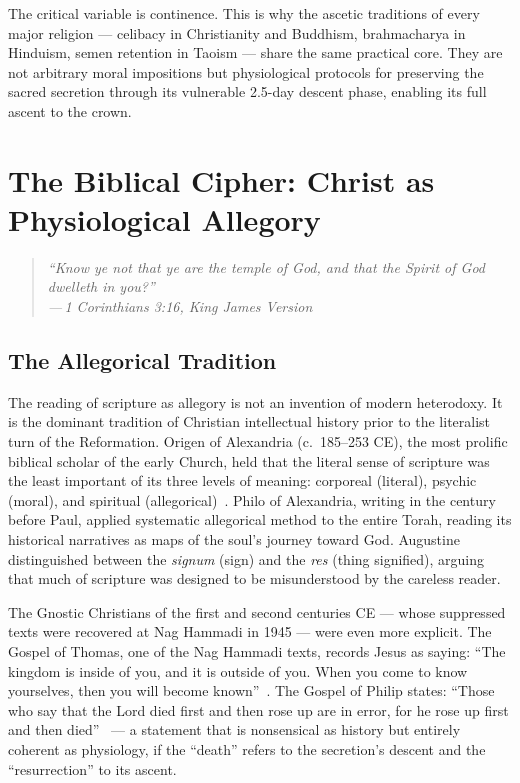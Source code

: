 \documentclass[12pt, a4paper]{article}
\newcommand{\epigraph}[2]{%
  \begin{quote}
    \itshape ``#1''\\[0.3em]
    \normalfont\small\hfill ---\,#2
  \end{quote}
}
\begin{document}
The critical variable is continence. This is why the ascetic traditions of
every major religion — celibacy in Christianity and Buddhism, brahmacharya in
Hinduism, semen retention in Taoism — share the same practical core. They are
not arbitrary moral impositions but physiological protocols for preserving the
sacred secretion through its vulnerable 2.5-day descent phase, enabling its
full ascent to the crown.

\section{The Biblical Cipher: Christ as Physiological Allegory}
\label{sec:bible}

\epigraph{Know ye not that ye are the temple of God, and that the Spirit of
God dwelleth in you?}{1 Corinthians 3:16, King James Version}

\subsection{The Allegorical Tradition}

The reading of scripture as allegory is not an invention of modern
heterodoxy. It is the dominant tradition of Christian intellectual history
prior to the literalist turn of the Reformation. Origen of Alexandria (c.~185--253
CE), the most prolific biblical scholar of the early Church, held that the
literal sense of scripture was the least important of its three levels of
meaning: corporeal (literal), psychic (moral), and spiritual
(allegorical)~\autocite[211]{pagels1979}. Philo of Alexandria, writing in the
century before Paul, applied systematic allegorical method to the entire
Torah, reading its historical narratives as maps of the soul's journey toward
God. Augustine distinguished between the \emph{signum} (sign) and the
\emph{res} (thing signified), arguing that much of scripture was designed to
be misunderstood by the careless reader.

The Gnostic Christians of the first and second centuries CE — whose suppressed
texts were recovered at Nag Hammadi in 1945 — were even more explicit. The
Gospel of Thomas, one of the Nag Hammadi texts, records Jesus as saying: ``The
kingdom is inside of you, and it is outside of you. When you come to know
yourselves, then you will become known''~\autocite[126]{naglibhammadi}. The
Gospel of Philip states: ``Those who say that the Lord died first and then rose
up are in error, for he rose up first and then died''~\autocite[153]{naglibhammadi} —
a statement that is nonsensical as history but entirely coherent as
physiology, if the ``death'' refers to the secretion's descent and the
``resurrection'' to its ascent.
\end{document}
